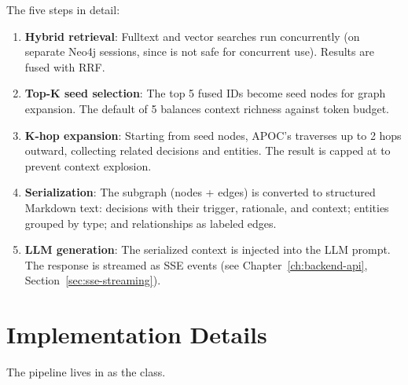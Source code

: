 The five steps in detail:

\begin{enumerate}
    \item \textbf{Hybrid retrieval}: Fulltext and vector searches run
          concurrently (on separate Neo4j sessions, since
           is not safe for concurrent use).  Results
          are fused with RRF.

    \item \textbf{Top-K seed selection}: The top 5 fused IDs become
          seed nodes for graph expansion.  The default of 5 balances
          context richness against token budget.

    \item \textbf{K-hop expansion}: Starting from seed nodes, APOC's
           traverses up to 2 hops outward,
          collecting related decisions and entities.  The result is
          capped at  to prevent context
          explosion.

    \item \textbf{Serialization}: The subgraph (nodes + edges) is
          converted to structured Markdown text: decisions with their
          trigger, rationale, and context; entities grouped by type;
          and relationships as labeled edges.

    \item \textbf{LLM generation}: The serialized context is injected
          into the LLM prompt.  The response is streamed as SSE events
          (see Chapter~\ref{ch:backend-api}, Section~\ref{sec:sse-streaming}).
\end{enumerate}


\section{Implementation Details}
\label{sec:graphrag-impl}

The pipeline lives in  as the
 class.


